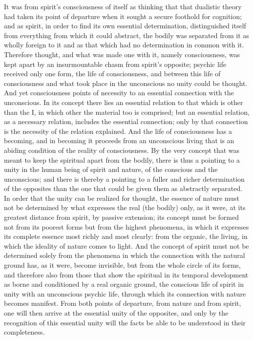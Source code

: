 \documentclass[12pt,a4paper,openany]{book}
\newcommand{\opage}[1]{\marginnote{\footnotesize\textit{[#1]}}}
\begin{document}
It was from spirit's consciousness of itself as thinking that that
dualistic theory had taken its point of departure when it sought a
secure foothold for cognition; and as spirit, in order to find its
own essential determination, distinguished itself from everything
from which it could abstract, the bodily was separated from it as
wholly foreign to it and as that which had no determination in
common with it. Therefore thought, and what was made one with it,
namely consciousness, was kept apart by an insurmountable chasm from
spirit's opposite; psychic life received only one form, the life of
consciousness, and between this life of consciousness and what took
place in the unconscious no unity could be thought. And yet
consciousness points of necessity to an essential connection with the
unconscious. In its concept there lies an essential relation to that
which is other than the I, in which other the material too is
comprised; but an essential relation, as a necessary relation, includes
the essential connection; only by that connection is the necessity of
the relation explained. And the life of consciousness has a becoming,
and in becoming it proceeds from an unconscious
\opage{45}living that is an abiding condition of the reality of consciousness.
By the very concept that was meant to keep the spiritual apart from
the bodily, there is thus a pointing to a unity in the human being of
spirit and nature, of the conscious and the unconscious; and there is
thereby a pointing to a fuller and richer determination of the
opposites than the one that could be given them as abstractly separated.
In order that the unity can be realized for thought, the essence of
nature must not be determined by what expresses the real (the bodily)
only, as it were, at its greatest distance from spirit, by passive
extension; its concept must be formed not from its poorest forms but
from the highest phenomena, in which it expresses its complete essence
most richly and most clearly: from the organic, the living, in which
the ideality of nature comes to light. And the concept of spirit must
not be determined solely from the phenomena in which the connection
with the natural ground has, as it were, become invisible, but from the
whole circle of its forms, and therefore also from those that show the
spiritual in its temporal development as borne and conditioned by a
real organic ground, the conscious life of spirit in unity with an
unconscious psychic life, through which its connection with nature
becomes manifest. From both points of departure, from nature and from
spirit, one will then arrive at the essential unity of the opposites,
and only by the recognition of this essential unity will the facts
be able to be understood in their completeness.
\end{document}
